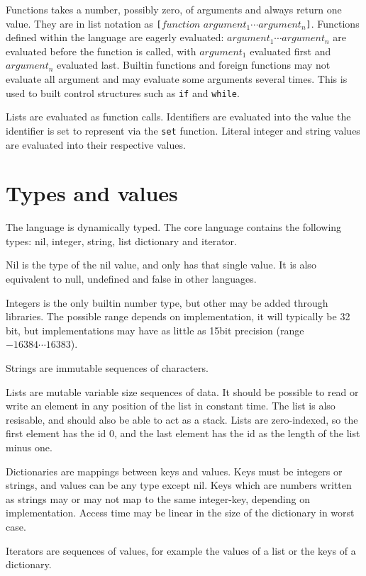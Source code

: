Functions takes a number, possibly zero, of arguments and always return one value.
They are in list notation as \verb|[|$function$ $argument_1 \cdots argument_n$\verb|]|.
Functions defined within the language are eagerly evaluated: $argument_1\cdots argument_n$ are evaluated before the function is called, with $argument_1$ evaluated first and $argument_n$ evaluated last.
Builtin functions and foreign functions may not evaluate all argument and may evaluate some arguments several times. This is used to built control structures such as \verb|if| and \verb|while|.

Lists are evaluated as function calls.
Identifiers are evaluated into the value the identifier is set to represent via the \verb|set| function.
Literal integer and string values are evaluated into their respective values.

\section{Types and values}
The language is dynamically typed.
The core language contains the following types: nil, integer, string, list dictionary and iterator.

Nil is the type of the nil value, and only has that single value. It is also equivalent to null, undefined and false in other languages.

Integers is the only builtin number type, but other may be added through libraries. The possible range depends on implementation, it will typically be 32 bit, but implementations may have as little as 15bit precision (range $-16384\cdots 16383$).

Strings are immutable sequences of characters.

Lists are mutable variable size sequences of data. It should be possible to read or write an element in any position of the list in constant time. The list is also resisable, and should also be able to act as a stack. 
Lists are zero-indexed, so the first element has the id 0, and the last element has the id as the length of the list minus one.

Dictionaries are mappings between keys and values. Keys must be integers or strings, and values can be any type except nil. Keys which are numbers written as strings may or may not map to the same integer-key, depending on implementation. Access time may be linear in the size of the dictionary in worst case.

Iterators are sequences of values, for example the values of a list or the keys of a dictionary. 

